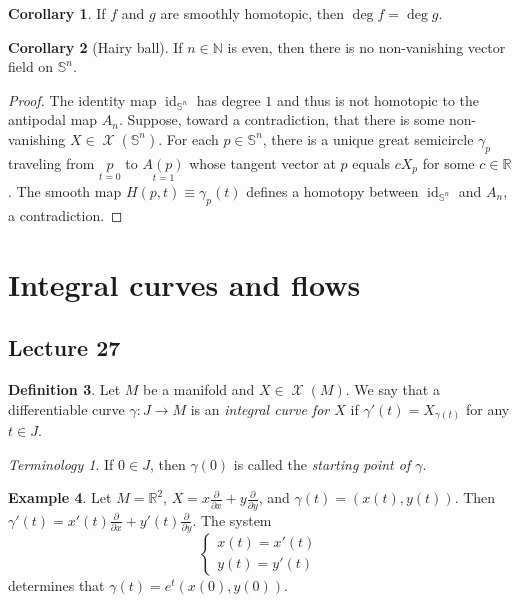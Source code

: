 \documentclass[10pt,letterpaper,cm]{nupset}
\theoremstyle{definition}
\newtheorem{definition}{Definition}[subsection]
\newtheorem{exmp}[definition]{Example}
\theoremstyle{theorem}
\newtheorem{corollary}[definition]{Corollary}
\theoremstyle{remark}
\newtheorem*{term}{Terminology}
\newcommand{\N}{\mathbb N}
\newcommand{\R}{\mathbb R}
\renewcommand{\S}{\mathbb S}
\newcommand{\1}{\mathbf{1}}
\newcommand{\0}{\vec 0}
\DeclareMathOperator{\id}{id}
\DeclareMathOperator{\vf}{\mathscr{X}}
\begin{document}
\begin{corollary}
If  $f$ and $g$ are smoothly homotopic, then $\deg f= \deg g$.
\end{corollary}

\begin{corollary}[Hairy ball]\label{hbt}
If $n\in \N$ is even, then there is no non-vanishing vector field on $\S^n$.
\end{corollary}
\begin{proof}
The identity map $\id_{\S^n}$ has degree $1$ and thus is not homotopic to the antipodal map $A_n$. Suppose, toward a contradiction, that there is some non-vanishing $X\in \vf(\S^n)$. For each $p\in \S^n$, there is a unique great semicircle $\gamma_p$ traveling from $\underset{t=0}{p}$ to $\underset{t=1}{A(p)}$ whose tangent vector at $p$ equals $c X_p$ for some $c\in \R$. The smooth map $H(p, t) \equiv \gamma_p(t)$ defines a homotopy between $\id_{\S^n}$  and $A_n$, a contradiction. 
\end{proof}

\section{Integral curves and flows}

\subsection{Lecture 27}

\begin{definition}
Let $M$ be a manifold and $X\in \vf(M)$. We say that a differentiable curve $\gamma : J \to M$ is an \textit{integral curve for $X$} if $\gamma'(t) = X_{\gamma(t)}$ for any $t\in J$.
\end{definition}

\begin{term}
If $0\in J$, then $\gamma(0)$ is called the \textit{starting point of $\gamma$}.
\end{term}

\begin{exmp}
Let $M= \R^2$, $X = x\frac{\partial}{\partial{x}} + y \frac{\partial}{\partial{y}}$, and $\gamma(t) = \left(x(t), y(t)\right)$. Then $\gamma'(t) = x'(t)\frac{\partial}{\partial{x}}  + y'(t)\frac{\partial}{\partial{y}}$.  The system 
\[
\begin{cases} x(t) = x'(t) \\ y(t) = y'(t) \end{cases}
\] determines that 
$\gamma(t) = e^t(x(0), y(0))$.
\end{exmp}
\end{document}
